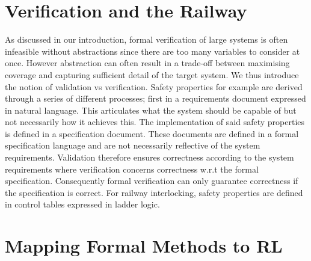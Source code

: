 \documentclass[runningheads]{llncs}
\begin{document}
\section{Verification and the Railway}
As discussed in our introduction, formal verification of large systems is often infeasible without abstractions since there are too many variables to consider at once. However abstraction can often result in a trade-off between maximising coverage and capturing sufficient detail of the target system. We thus introduce the notion of validation vs verification.
Safety properties for example are derived through a series of different processes; first in a requirements document expressed in natural language. This articulates what the system should be capable of but not necessarily how it achieves this. The implementation of said safety properties is defined in a specification document. These documents are defined in a formal specification language and are not necessarily reflective of the system requirements.
Validation therefore ensures correctness according to the system requirements where verification concerns correctness w.r.t the formal specification. Consequently formal verification can only guarantee correctness if the specification is correct. For railway interlocking, safety properties are defined in control tables expressed in ladder logic.

\section{Mapping Formal Methods to RL}
\end{document}
